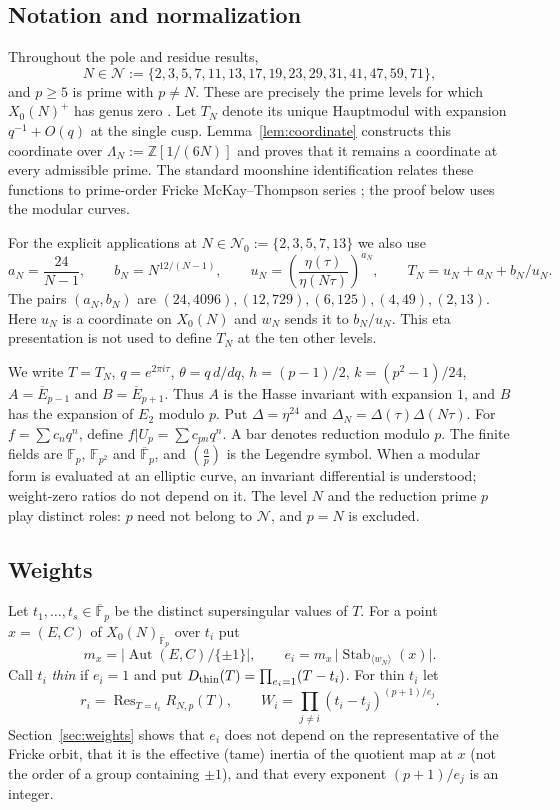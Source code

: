 \documentclass[11pt,a4paper]{article}
\numberwithin{equation}{section}
\theoremstyle{definition}
\theoremstyle{remark}
\newcommand{\Fp}{\mathbb F_p}
\newcommand{\Fq}{\mathbb F_{p^2}}
\newcommand{\Fb}{\overline{\mathbb F}_p}
\newcommand{\Z}{\mathbb Z}
\newcommand{\Res}{\operatorname{Res}}
\newcommand{\Aut}{\operatorname{Aut}}
\newcommand{\Stab}{\operatorname{Stab}}
\begin{document}
\subsection{Notation and normalization}
Throughout the pole and residue results,
\[
N\in\mathcal N:=\{2,3,5,7,11,13,17,19,23,29,31,41,47,59,71\},
\]
and $p\ge5$ is prime with $p\ne N$.
These are precisely the prime levels for which $X_0(N)^+$ has genus
zero \citep[\S3, Corollary]{Ogg75}. Let $T_N$ denote its unique
Hauptmodul with expansion $q^{-1}+O(q)$ at the single cusp.
Lemma~\ref{lem:coordinate} constructs this coordinate over
$\Lambda_N:=\Z[1/(6N)]$ and proves that it remains a coordinate
at every admissible prime. The standard moonshine identification
relates these functions to prime-order Fricke McKay--Thompson series
\citep{CN79,CMT19}; the proof below uses the modular curves.

For the explicit applications at
$N\in\mathcal N_0:=\{2,3,5,7,13\}$ we also use
\[
a_N=\frac{24}{N-1},\qquad b_N=N^{12/(N-1)},\qquad
u_N=\left(\frac{\eta(\tau)}{\eta(N\tau)}\right)^{a_N},\qquad
T_N=u_N+a_N+b_N/u_N.
\]
The pairs $(a_N,b_N)$ are $(24,4096),(12,729),(6,125),(4,49),(2,13)$.
Here $u_N$ is a coordinate on $X_0(N)$ and $w_N$ sends it to $b_N/u_N$.
This eta presentation is not used to define $T_N$ at the ten other levels.

We write $T=T_N$, $q=e^{2\pi i\tau}$, $\theta=q\,d/dq$,
$h=(p-1)/2$, $k=(p^2-1)/24$, $A=\overline E_{p-1}$ and
$B=\overline E_{p+1}$. Thus $A$ is the Hasse invariant with expansion
$1$, and $B$ has the expansion of $E_2$ modulo $p$. Put
$\Delta=\eta^{24}$ and $\Delta_N=\Delta(\tau)\Delta(N\tau)$.
For $f=\sum c_nq^n$, define $f|U_p=\sum c_{pn}q^n$.
A bar denotes reduction modulo $p$. The finite fields are
$\Fp$, $\Fq$ and $\Fb$, and $\left(\frac{a}{p}\right)$ is the Legendre symbol.
When a modular form is evaluated at an elliptic curve, an invariant
differential is understood; weight-zero ratios do not depend on it.
The level $N$ and the reduction prime $p$ play distinct roles:
$p$ need not belong to $\mathcal N$, and $p=N$ is excluded.

\subsection{Weights}
Let $t_1,\dots,t_s\in\Fb$ be the distinct supersingular values of $T$. For a point
$x=(E,C)$ of $X_0(N)_{\Fb}$ over $t_i$ put
\[
m_x=\bigl|\Aut(E,C)/\{\pm1\}\bigr|,\qquad e_i=m_x\,\bigl|\Stab_{\langle w_N\rangle}(x)\bigr|.
\]
Call $t_i$ \emph{thin} if $e_i=1$ and put $D_{\rm thin}(T)=\prod_{e_i=1}(T-t_i)$. For thin $t_i$ let
\[
r_i=\Res_{T=t_i}R_{N,p}(T),\qquad W_i=\prod_{j\ne i}(t_i-t_j)^{(p+1)/e_j}.
\]
Section~\ref{sec:weights} shows that $e_i$ does not depend on the representative of the Fricke
orbit, that it is the effective (tame) inertia of the quotient map at $x$ (not the order of a group
containing $\pm1$), and that every exponent $(p+1)/e_j$ is an integer.
\end{document}
